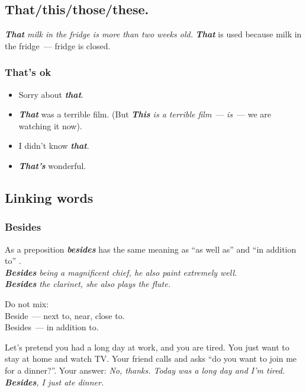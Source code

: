 \documentclass[10pt,a4paper]{article}
\newlength{\OriginalParIndent}
\newcommand\ex[1]{\textit{\textbf{{#1}}}}           %
\newenvironment{ItemizeWithOrigParIndent}
    {\begin{itemize}[leftmargin=\OriginalParIndent]}
    {\end{itemize}}
\begin{document}
\subsection{That/this/those/these.}
\textit{\ex{That} milk in the fridge is more than two weeks old.} \ex{That} is used because milk in
the fridge~--- fridge is closed.

\subsubsection{That's ok}
\begin{ItemizeWithOrigParIndent}
  \item Sorry about \ex{that}.
  \item \ex{That} was a terrible film. (But \textit{\ex{This} is a terrible film}~---
  \textit{is}~--- we are watching it now).
  \item I didn't know \ex{that}.
  \item \ex{That's} wonderful.
\end{ItemizeWithOrigParIndent}





\subsection{Linking words}
\subsubsection{Besides}
As a preposition \ex{besides} has the same meaning as ``as well as'' and ``in addition to'' .\\
\textit{\ex{Besides} being a magnificent chief, he also paint extremely well.}\\
\textit{\ex{Besides} the clarinet, she also plays the flute.}

Do not mix:\\
Beside~--- next to, near, close to.\\
Besides~--- in addition to.

Let's pretend you had a long day at work, and you are tired. You just want to stay at home and watch TV. Your friend calls and asks ``do you want to join me for a dinner?''.
Your answer: \textit{No, thanks. Today was a long day and I'm tired. \ex{Besides}, I just ate dinner.}
\end{document}

